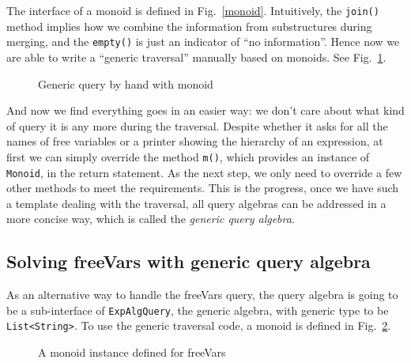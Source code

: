 The interface of a monoid is defined in Fig.~\ref{monoid}. Intuitively, the \lstinline{join()}
method implies how we combine the information from substructures during
merging, and the \lstinline{empty()} is just an indicator of ``no
information''. Hence now we are able to write a ``generic traversal''
manually based on monoids. See Fig.~\ref{generic_query}.
\begin{comment}
\bruno{As you can see, nothing
  follows! Please refer to the figure instead and briefly explain the
  code in the figure.}
\end{comment}

\begin{figure}[tb]
\vspace{-.1in}
\caption{Generic query by hand with monoid}
\label{generic_query}
\end{figure}

And now we find everything goes in an easier way: we don't care about what kind of query it is any more during the traversal. Despite whether it asks for all the names of free variables or a printer showing the hierarchy of an expression, at first we can simply override the method \lstinline{m()}, which provides an instance of \lstinline{Monoid}, in the return statement. As the next step, we only need to override a few other methods to meet the requirements. This is the progress, once we have such a template dealing with the traversal, all query algebras can be addressed in a more concise way, which is called the \textit{generic query algebra}.

\subsection{Solving freeVars with generic query algebra}\label{subsec:solvingfreevars}

As an alternative way to handle the freeVars query, the query algebra is going to be a sub-interface of \lstinline{ExpAlgQuery}, the generic algebra, with generic type to be \lstinline{List<String>}. To use the generic traversal code, a monoid is defined in Fig.~\ref{freevars_monoid}.

\begin{figure}[tb]
\vspace{-.1in}
\caption{A monoid instance defined for freeVars}
\label{freevars_monoid}
\end{figure}

